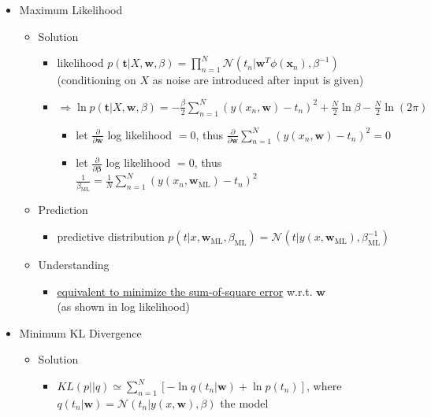 \begin{itemize}
\begin{itemize}
	\end{itemize}
\item Maximum Likelihood
	\begin{itemize}
	\item Solution
		\begin{itemize}
		\item likelihood $\displaystyle p(\mathbf t| X,\mathbf w,\beta) = \prod_{n=1}^N \mathcal N(t_n|\mathbf w ^T\phi(\mathbf x_n), \beta^{-1})$ \\
		(conditioning on $X$ as noise are introduced after input is given)
		\item $\Rightarrow \displaystyle \ln p(\mathbf t|X,\mathbf w,\beta) = - \frac \beta 2 \sum_{n=1}^N (y(x_n, \mathbf w) - t_n)^2 + \frac N2 \ln\beta - \frac N 2 \ln(2\pi)$
			\begin{itemize}
			\item let $\frac {\partial}{\partial \mathbf w}$ log likelihood $= 0$, thus $\frac {\partial}{\partial \mathbf w} \sum_{n=1}^N(y(x_n, \mathbf w)-t_n)^2 =0$
			\item let $\frac {\partial}{\partial \mathbf \beta}$ log likelihood $= 0$, thus $\frac 1 {\beta_\text{ML}}=\frac 1 N \sum_{n=1}^N(y(x_n, \mathbf w_\text{ML})-t_n)^2$
			\end{itemize}
		\end{itemize}
	\item Prediction
		\begin{itemize}
		\item predictive distribution $p(t|x, \mathbf w_\text{ML}, \beta_\text{ML})=\mathcal N(t|y(x, \mathbf w_\text{ML}), \beta^{-1}_\text{ML})$
		\end{itemize}
	\item Understanding
		\begin{itemize}
		\item \underline{equivalent to minimize the sum-of-square error} w.r.t. $\mathbf w$ \\
		(as shown in log likelihood)
		\end{itemize}
	\end{itemize}
\item Minimum KL Divergence
	\begin{itemize}
	\item Solution
		\begin{itemize}
		\item $KL(p||q) \simeq \sum_{n=1}^N [-\ln q(t_n|\mathbf w) + \ln p(t_n)]$, where $q(t_n|\mathbf w) = \mathcal N(t_n|y(x, \mathbf w), \beta)$ the model \\

\end{itemize}
\end{itemize}
\end{itemize}
